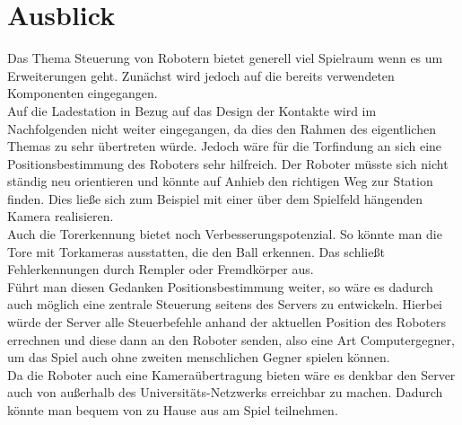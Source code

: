 \section{Ausblick}

Das Thema Steuerung von Robotern bietet generell viel Spielraum wenn es um Erweiterungen geht. Zunächst wird jedoch auf die bereits verwendeten Komponenten eingegangen.\\
Auf die Ladestation in Bezug auf das Design der Kontakte wird im Nachfolgenden nicht weiter eingegangen, da dies den Rahmen des eigentlichen Themas zu sehr übertreten würde. Jedoch wäre für die Torfindung an sich eine Positionsbestimmung des Roboters sehr hilfreich. Der Roboter müsste sich nicht ständig neu orientieren und könnte auf Anhieb den richtigen Weg zur Station finden. Dies ließe sich zum Beispiel mit einer über dem Spielfeld hängenden Kamera realisieren.  \\
Auch die Torerkennung bietet noch Verbesserungspotenzial. So könnte man die Tore mit Torkameras ausstatten, die den Ball erkennen. Das schließt Fehlerkennungen durch Rempler oder Fremdkörper aus. \\

Führt man diesen Gedanken Positionsbestimmung weiter, so wäre es dadurch auch möglich eine zentrale Steuerung seitens des Servers zu entwickeln. Hierbei würde der Server alle Steuerbefehle anhand der aktuellen Position des Roboters errechnen und diese dann an den Roboter senden, also eine Art Computergegner, um das Spiel auch ohne zweiten menschlichen Gegner spielen können. \\
Da die Roboter auch eine Kameraübertragung bieten wäre es denkbar den Server auch von außerhalb des Universitäts-Netzwerks erreichbar zu machen. Dadurch könnte man bequem von zu Hause aus am Spiel teilnehmen.